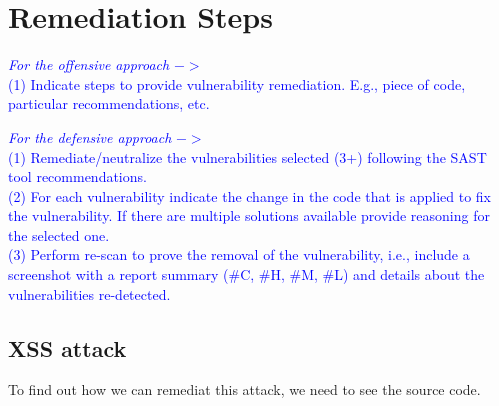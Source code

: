 \documentclass{article}
\begin{document}
\section{Remediation Steps}
\label{}

\textcolor{blue}{\textit{For the offensive approach} $->$\\
    (1) Indicate steps to provide vulnerability remediation. E.g., piece of code, particular recommendations, etc.}

\textcolor{blue}{\textit{For the defensive approach} $->$\\
    (1) Remediate/neutralize the vulnerabilities selected (3+) following the SAST tool recommendations.}\\
\textcolor{blue}{(2) For each vulnerability indicate the change in the code that is applied to fix the vulnerability. If there are multiple solutions available provide reasoning for the selected one.} \\
\textcolor{blue}{(3) Perform re-scan to prove the removal of the vulnerability, i.e., include a screenshot with a report summary (\#C, \#H, \#M, \#L) and details about the vulnerabilities re-detected.}

\subsection{XSS attack}
\label{xss-attack}
To find out how we can remediat this attack, we need to see the source code.
\end{document}
